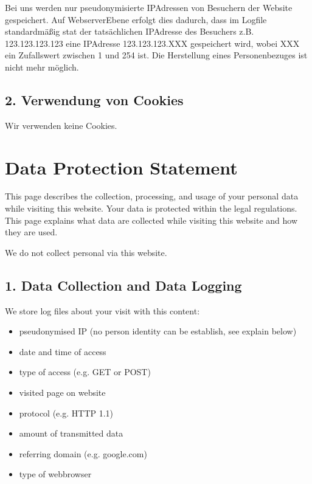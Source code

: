 \documentclass[letterpaper,10pt,english]{sphinxmanual}
\begin{document}
Bei uns werden nur pseudonymisierte IP\sphinxhyphen{}Adressen von Besuchern der Website
gespeichert.
Auf Webserver\sphinxhyphen{}Ebene erfolgt dies dadurch, dass im Logfile standardmäßig stat
der tatsächlichen IP\sphinxhyphen{}Adresse des Besuchers z.B. 123.123.123.123 eine
IP\sphinxhyphen{}Adresse 123.123.123.XXX gespeichert wird, wobei XXX ein Zufallswert
zwischen 1 und 254 ist.
Die Herstellung eines Personenbezuges ist nicht mehr möglich.


\section{2. Verwendung von Cookies}
\label{\detokenize{datenschutz:verwendung-von-cookies}}
Wir verwenden keine Cookies.


\chapter{Data Protection Statement}
\label{\detokenize{datenschutz:data-protection-statement}}

This page describes the collection, processing, and usage of your
personal data while visiting this website.
Your data is protected within the legal regulations.
This page explains what data are collected while visiting this website
and how they are used.

We do not collect personal via this website.


\section{1. Data Collection and Data  Logging}
\label{\detokenize{datenschutz:data-collection-and-data-logging}}
We store log files about your visit with this content:
\begin{itemize}
\item {} 
pseudonymised IP (no person identity can be establish, see explain below)

\item {} 
date and time of access

\item {} 
type of access (e.g. GET or POST)

\item {} 
visited page on website

\item {} 
protocol (e.g. HTTP 1.1)

\item {} 
amount of transmitted data

\item {} 
referring domain (e.g. google.com)

\item {} 
type of webbrowser

\end{itemize}
\end{document}
